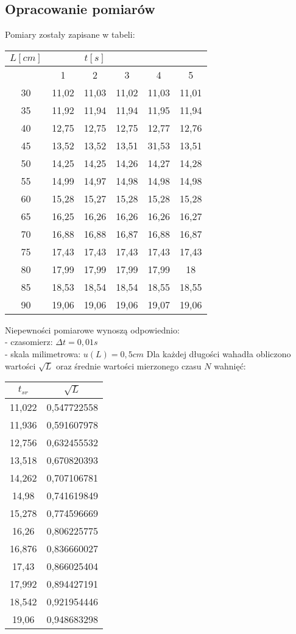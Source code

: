 \documentclass{article}
\begin{document}
\begin{small}
\subsection*{Opracowanie pomiarów}
Pomiary zostały zapisane w tabeli: 
\begin{center}
\begin{tabular}{|c|c|c|c|c|c|} \hline
$L[cm]$ & \multicolumn{3}{c|}{$t[s]$}\\ \hline
 & 1 & 2 & 3 & 4 & 5 \\ \hline
30 & 11,02 & 11,03 & 11,02 & 11,03 & 11,01 \\ \hline
35 & 11,92 & 11,94 & 11,94 & 11,95 & 11,94 \\ \hline
40 & 12,75 & 12,75 & 12,75 & 12,77 & 12,76\\ \hline
45 & 13,52 & 13,52 & 13,51 & 31,53 & 13,51\\ \hline
50 & 14,25 & 14,25 & 14,26 & 14,27 & 14,28 \\ \hline
55 & 14,99 & 14,97 & 14,98 & 14,98 & 14,98 \\ \hline
60 & 15,28 & 15,27 & 15,28 & 15,28 & 15,28\\ \hline
65 & 16,25 & 16,26 & 16,26 & 16,26 & 16,27\\ \hline
70 & 16,88 & 16,88 & 16,87 & 16,88 & 16,87 \\ \hline
75 & 17,43 & 17,43 & 17,43 & 17,43 & 17,43\\ \hline
80 & 17,99 & 17,99 & 17,99 & 17,99 & 18\\ \hline
85 & 18,53 & 18,54 & 18,54 & 18,55 & 18,55 \\ \hline
90 & 19,06 & 19,06 & 19,06 & 19,07 & 19,06\\ \hline
\end{tabular}

\end{center}
Niepewności pomiarowe wynoszą odpowiednio:\\ - czasomierz: $\Delta t=0,01 s$ \\- skala milimetrowa: $u(L)= 0,5 cm$
\newpage
Dla każdej długości wahadła obliczono wartości $\sqrt{L}$ oraz średnie wartości mierzonego czasu $N$ wahnięć:
\begin{center}
\begin{tabular}{|c|c|} \hline
$t_{sr}$ & $\sqrt{L}$ \\ \hline
11,022 & 0,547722558 \\ \hline
11,936 & 0,591607978 \\ \hline
12,756 & 0,632455532 \\ \hline
13,518 & 0,670820393 \\ \hline
14,262 & 0,707106781 \\ \hline
14,98 & 0,741619849 \\ \hline
15,278 & 0,774596669  \\ \hline
16,26 & 0,806225775 \\ \hline
16,876 & 0,836660027\\ \hline
17,43 & 0,866025404 \\ \hline
17,992 & 0,894427191\\ \hline
18,542 & 0,921954446 \\ \hline
19,06 & 0,948683298\\ \hline


\end{tabular}
\end{center}
\end{small}
\end{document}
